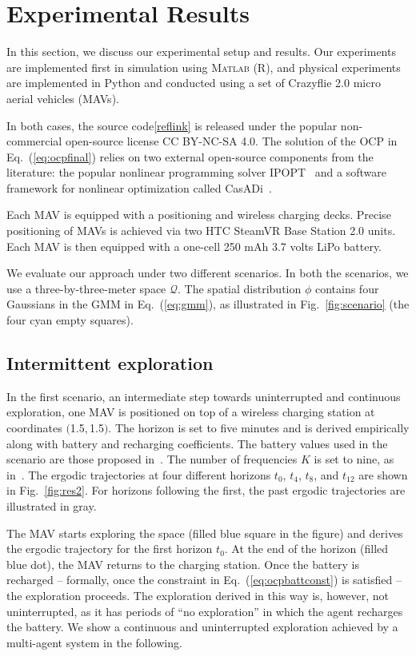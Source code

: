 \documentclass[letterpaper,10pt,conference,twoside]{IEEEtran}
\theoremstyle{definition}
\begin{document}
\section{Experimental Results}\label{sec:res}
\noindent
In this section, we discuss our experimental setup and results. Our experiments are implemented first in simulation using  \textsc{Matlab} (R), and physical experiments  are implemented in Python and conducted using a set of Crazyflie 2.0 micro aerial vehicles (MAVs). 

In both cases, the source code\cref{reflink} is released under the popular non-commercial open-source license CC BY-NC-SA 4.0. The solution of the OCP in Eq.~(\ref{eq:ocpfinal}) relies on two external open-source components from the literature: the popular nonlinear programming solver IPOPT~\cite{wachter2006implementation} and a software framework for nonlinear optimization called CasADi~\cite{andersson2012casadi}.

Each MAV is equipped with a positioning and wireless charging decks. Precise positioning of MAVs is achieved via two HTC SteamVR Base Station 2.0 units. Each MAV is then equipped with a one-cell 250 mAh 3.7 volts LiPo battery.%

We evaluate our approach under two different scenarios. In both the scenarios, we use a three-by-three-meter space $\mathcal{Q}$. The spatial distribution $\phi$ contains four Gaussians in the GMM in Eq.~(\ref{eq:gmm}), as illustrated in Fig.~\ref{fig:scenario} (the four cyan empty squares).

\subsection*{Intermittent exploration}
\noindent
In the first scenario, an intermediate step towards uninterrupted and continuous exploration, one MAV is positioned on top of a wireless charging station at coordinates $($1.5$,$1.5$)$. The horizon is set to five minutes and is derived empirically along with battery and recharging coefficients. The battery values used in the scenario are those proposed in~\cite{zhao2017observability}. The number of frequencies $K$ is set to nine, as in~\cite{calinon2020mixture}. The ergodic trajectories at four different horizons $t_0$, $t_4$, $t_8$, and $t_{12}$ are shown in Fig.~\ref{fig:res2}. For horizons following the first, the past ergodic trajectories are illustrated in gray.

The MAV starts exploring the space (filled blue square in the figure) and derives the ergodic trajectory for the first horizon $t_0$. At the end of the horizon (filled blue dot), the MAV returns to the charging station. Once the battery is recharged -- formally, once the constraint in Eq.~(\ref{eq:ocpbattconst}) is satisfied -- the exploration proceeds. The exploration derived in this way is, however, not uninterrupted, as it has periods of ``no exploration'' in which the agent recharges the battery. We show a continuous and uninterrupted exploration achieved by a multi-agent system in the following.
\end{document}

